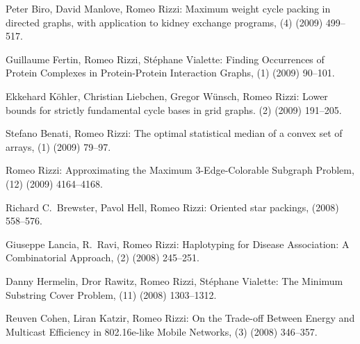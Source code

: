 \begin{etaremune}
  \item {\sc Peter Biro, David Manlove, Romeo Rizzi:}
   \newblock   Maximum weight cycle packing in directed graphs, with application to kidney exchange programs,
   (4) (2009) 499--517.

  \item {\sc Guillaume Fertin, Romeo Rizzi, St\'ephane Vialette:}
   \newblock  Finding Occurrences of Protein
              Complexes in Protein-Protein Interaction Graphs,
   (1) (2009) 90--101.

  \item {\sc Ekkehard K\"ohler, Christian Liebchen, Gregor W\"unsch, Romeo Rizzi:}
   \newblock  Lower bounds for strictly fundamental cycle bases in grid graphs.    
   (2) (2009) 191--205.

  \item {\sc Stefano Benati, Romeo Rizzi:}
   \newblock   The optimal statistical median of a convex set of arrays,
   (1) (2009) 79--97.

  \item {\sc Romeo Rizzi:}
   \newblock   Approximating the Maximum $3$-Edge-Colorable Subgraph Problem,
   (12) (2009) 4164--4168.

  \item {\sc Richard C.~Brewster, Pavol Hell, Romeo Rizzi:}
   \newblock  Oriented star packings,
    (2008) 558--576.

  \item {\sc Giuseppe Lancia, R.~Ravi, Romeo Rizzi:}
   \newblock  Haplotyping for Disease Association: A Combinatorial Approach, 
   (2) (2008) 245--251.

  \item {\sc Danny Hermelin, Dror Rawitz, Romeo Rizzi, St\'ephane Vialette:}
   \newblock  The Minimum Substring Cover Problem,
   (11) (2008) 1303--1312.

  \item {\sc Reuven Cohen, Liran Katzir, Romeo Rizzi:}
   \newblock   On the Trade-off Between Energy and Multicast Efficiency in 802.16e-like Mobile Networks,
   (3) (2008) 346--357.


\end{etaremune}
